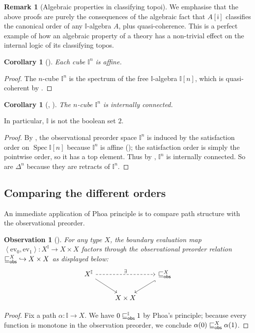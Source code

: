 \documentclass[a4paper,12pt]{amsart}
\newtheorem{corollary}[theorem]{Corollary}
\newtheorem{observation}[theorem]{Observation}
\theoremstyle{definition}
\newtheorem{remark}[theorem]{Remark}
\newcommand{\mbb}[1]{\mathbb{#1}}
\newcommand{\I}{\mbb I}
\newcommand{\ms}[1]{\mathsf{#1}}
\newcommand{\pair}[1]{\left\langle#1\right\rangle}
\newcommand{\ev}{\mathrm{ev}}
\newcommand{\hook}{\hookrightarrow}
\newcommand{\spec}{\operatorname{Spec}}
\begin{document}
\begin{remark}[Algebraic properties in classifying topoi]\label{rem:normalalgebra}
  We emphasise that the above proofs are purely the consequences of the algebraic fact that $A[\ms{i}]$ classifies the canonical order of any $\I$-algebra $A$, plus quasi-coherence. This is a perfect example of how an algebraic property of a theory has a non-trivial effect on the internal logic of its classifying topos.
\end{remark}

\begin{corollary}[\AxiomSQCP]\label{lem:cubes-are-affine}
  Each cube $\I^n$ is affine.
\end{corollary}
\begin{proof}
  The $n$-cube $\I^n$ is the spectrum of the free $\I$-algebra $\I[n]$, which is quasi-coherent by .
\end{proof}

\begin{corollary}[\AxiomNT, \AxiomSQCP]\label{cor:cubes-internally-connected}
  The $n$-cube $\I^n$ is internally connected.
\end{corollary}

In particular, $\I$ is not the boolean set $2$.

\begin{proof}
   By , the observational preorder space $\I^n$ is induced by the satisfaction order on $\spec\I[n]$ because $\I^n$ is affine (); the satisfaction order is simply the pointwise order, so it has a top element. Thus by , $\I^n$ is internally connected. So are $\Delta^n$ because they are retracts of $\I^n$.
\end{proof}

\subsection{Comparing the different orders}

An immediate application of Phoa principle is to compare path structure with the observational preorder.

\begin{observation}[\AxiomSQCP]
  For any type $X$, the boundary evaluation map $\pair{\ev_0,\ev_1}\colon X^\I\to X\times X$ factors through the observational preorder relation ${\obsle[X]}\hook X\times X$ as displayed below:
  \[ 
    \begin{tikzcd}
      X^\I 
        \arrow[rr,densely dashed, "\exists"]
        \arrow[dr]
      && 
      {\obsle[X]}
        \arrow[dl,hookrightarrow]
      \\ 
      &
      X\times X
    \end{tikzcd}
  \] 
\end{observation}
\begin{proof}
  Fix a path $\alpha\colon \I\to X$. We have $0\obsle[\I] 1$ by Phoa's principle; because every function is monotone in the observation preorder, we conclude $\alpha(0)\obsle[X] \alpha(1)$.
\end{proof}
\end{document}
